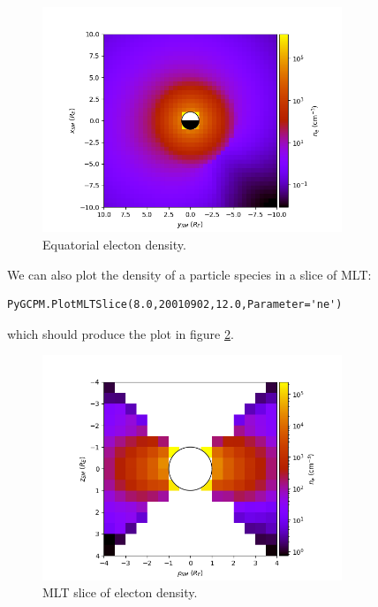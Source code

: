 			\begin{figure}
				\begin{center}
					\includegraphics[width=0.8\textwidth]{figures/ch2_pygcpm_equator.png}
				\end{center}
				\caption{Equatorial electon density. \label{FigPyGCPMEq}}
			\end{figure}

			We can also plot the density of a particle species in a slice of MLT:
			\begin{verbatim}
PyGCPM.PlotMLTSlice(8.0,20010902,12.0,Parameter='ne')
			\end{verbatim}
			which should produce the plot in figure \ref{FigPyGCPMMLT}.

			\begin{figure}
				\begin{center}
					\includegraphics[width=0.8\textwidth]{figures/ch2_pygcpm_mlt.png}
				\end{center}
				\caption{MLT slice of electon density. \label{FigPyGCPMMLT}}
			\end{figure}